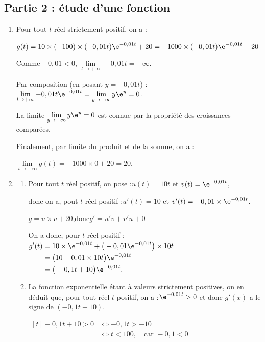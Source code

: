 \subsection*{Partie 2 : étude d'une fonction}

\begin{enumerate}
	\item Pour tout $t$ réel strictement positif, on a :

$g(t) = 10 \times (-100) \times (-0,01t)\e^{-0,01t} + 20=-1000 \times (-0,01t)\e^{-0,01t} + 20$

Comme $-0,01 < 0$, \quad$\lim\limits_{t \to +\infty} -0,01t = -\infty$.

Par composition (en posant $y = -0,01t$) :\quad $\lim\limits_{t \to +\infty} -0,01t \e^{-0,01t} = \lim\limits_{y \to -\infty} y\e^{y} = 0$.

La limite $\lim\limits_{y \to -\infty} y\e^{y} = 0$ est connue par la propriété des croissances comparées.

Finalement, par limite du produit et de la somme, on a :

$\lim\limits_{t \to +\infty} g(t) = -1000 \times 0 + 20 = 20$.

	\item \begin{enumerate}
		\item Pour tout $t$ réel positif, on pose :\quad $u(t) = 10t$ \quad et \quad $v(t) = \e^{-0,01t}$,

donc on a, pout $t$ réel positif :\quad $u'(t) = 10$ \quad et \quad $v'(t) = -0,01 \times \e^{-0,01t}$.

$g = u\times v + 20$,\quad donc\quad $g' = u'v+v'u + 0$

On a donc, pour $t$ réel positif : \quad $  \begin{aligned}[t] g'(t) &= 10 \times \e^{-0,01t} + \big(-0,01\e^{-0,01t}\big)\times 10t\\
		&= \big(10 - 0,01\times 10t\big)\e^{-0,01t}\\
		&= \big(-0,1 t + 10\big) \e^{-0,01 t}.\end{aligned}$

		\item La fonction exponentielle étant à valeurs strictement positives, on en déduit que, pour tout réel $t$ positif, on a :\quad $\e^{-0,01t} >0$ \quad et donc $g'(x)$ a le signe de \quad $(-0,1t+ 10)$.

$\begin{aligned}[t] -0,1t + 10 > 0 &\iff -0,1t > -10\\
&\iff t < 100,\quad \text{car }  -0,1 < 0\end{aligned}$


\end{enumerate}
\end{enumerate}
